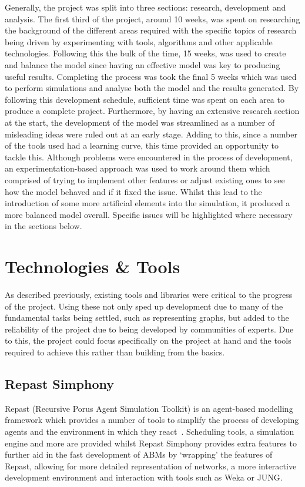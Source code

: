 \documentclass[]{report}
\begin{document}
Generally, the project was split into three sections: research, development and analysis. The first third of the project, around 10 weeks, was spent on researching the background of the different areas required with the specific topics of research being driven by experimenting with tools, algorithms and other applicable technologies. Following this the bulk of the time, 15 weeks, was used to create and balance the model since having an effective model was key to producing useful results. Completing the process was took the final 5 weeks which was used to perform simulations and analyse both the model and the results generated. By following this development schedule, sufficient time was spent on each area to produce a complete project. Furthermore, by having an extensive research section at the start, the development of the model was streamlined as a number of misleading ideas were ruled out at an early stage. Adding to this, since a number of the tools used had a learning curve, this time provided an opportunity to tackle this. Although problems were encountered in the process of development, an experimentation-based approach was used to work around them which comprised of trying to implement other features or adjust existing ones to see how the model behaved and if it fixed the issue. Whilst this lead to the introduction of some more artificial elements into the simulation, it produced a more balanced model overall. Specific issues will be highlighted where necessary in the sections below.

\section{Technologies \& Tools}
As described previously, existing tools and libraries were critical to the progress of the project. Using these not only sped up development due to many of the fundamental tasks being settled, such as representing graphs, but added to the reliability of the project due to being developed by communities of experts. Due to this, the project could focus specifically on the project at hand and the tools required to achieve this rather than building from the basics.

\subsection{Repast Simphony}
Repast (Recursive Porus Agent Simulation Toolkit) is an agent-based modelling framework which provides a number of tools to simplify the process of developing agents and the environment in which they react~\cite{repast-main}. Scheduling tools, a simulation engine and more are provided whilst Repast Simphony provides extra features to further aid in the fast development of ABMs by `wrapping' the features of Repast, allowing for more detailed representation of networks, a more interactive development environment and interaction with tools such as Weka or JUNG.
\end{document}
